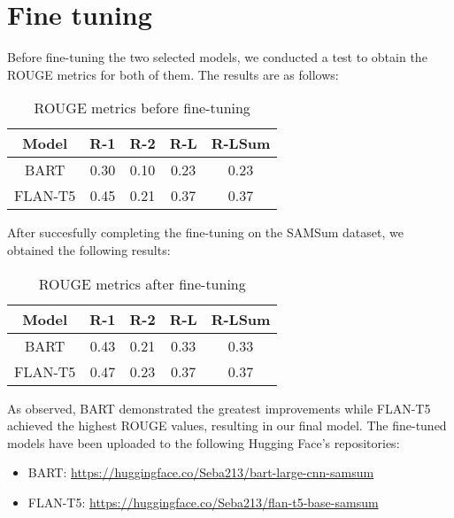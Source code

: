 \documentclass[10pt,twocolumn,letterpaper]{article}
\begin{document}
\section{Fine tuning}
Before fine-tuning the two selected models, we conducted a test to obtain the ROUGE metrics for both of them.
The results are as follows:
\FloatBarrier
\begin{table}[h!]
    \centering
    \begin{tabular}{|c|c|c|c|c|}
        \hline
        \rowcolor{lightergray}
        Model & R-1 & R-2 & R-L & R-LSum \\ 
        \hline
        BART & 0.30 & 0.10 & 0.23 & 0.23\\
        FLAN-T5 & 0.45 & 0.21 & 0.37 & 0.37\\
        \hline
    \end{tabular}
    \caption{ROUGE metrics before fine-tuning}
    \label{table:ROUGEbeforeft}
\end{table}
\FloatBarrier \noindent 
After succesfully completing the fine-tuning on the SAMSum dataset, we obtained the following results:
\FloatBarrier
\begin{table}[h!]
    \centering
    \begin{tabular}{|c|c|c|c|c|}
        \hline
        \rowcolor{lightergray}
        Model & R-1 & R-2 & R-L & R-LSum \\ 
        \hline
        BART & 0.43 & 0.21 & 0.33 & 0.33\\
        FLAN-T5 & 0.47 & 0.23 & 0.37 & 0.37 \\
        \hline
    \end{tabular}
    \caption{ROUGE metrics after fine-tuning}
    \label{table:ROUGEafterft}
\end{table}
\FloatBarrier \noindent
As observed, BART demonstrated the greatest improvements while FLAN-T5 achieved the highest ROUGE values, resulting in our final model.
The fine-tuned models have been uploaded to the following Hugging Face's repositories:
\begin{itemize}
    \item BART: \url{https://huggingface.co/Seba213/bart-large-cnn-samsum}
    \item FLAN-T5: \url{https://huggingface.co/Seba213/flan-t5-base-samsum}
\end{itemize}
\end{document}
